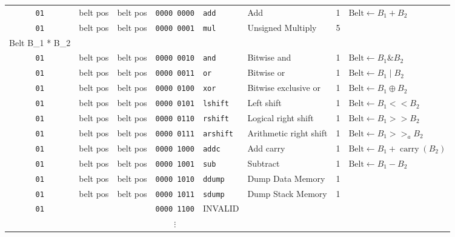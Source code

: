 \documentclass{article}
\begin{document}
\begin{landscape}
\begin{longtable}{c c c c l l c l}
		\texttt{01} & belt pos & belt pos & \texttt{0000 0000} & \texttt{add}     & Add                    & 1 &
			\(\textrm{Belt} \gets B_1 + B_2\) \\
		\texttt{01} & belt pos & belt pos & \texttt{0000 0001} & \texttt{mul}     & Unsigned Multiply      & 5 &
			\(\begin{array}{l}
				\textrm{Belt} \gets \left(B_1 * B_2\right) << 16, \\
				\textrm{Belt} \gets B_1 * B_2
			\end{array}\) \\
		\texttt{01} & belt pos & belt pos & \texttt{0000 0010} & \texttt{and}     & Bitwise and            & 1 &
			\(\textrm{Belt} \gets B_1 \mathop{\&} B_2\) \\
		\texttt{01} & belt pos & belt pos & \texttt{0000 0011} & \texttt{or}      & Bitwise or             & 1 &
			\(\textrm{Belt} \gets B_1 \mathop{|} B_2\) \\
		\texttt{01} & belt pos & belt pos & \texttt{0000 0100} & \texttt{xor}     & Bitwise exclusive or   & 1 &
			\(\textrm{Belt} \gets B_1 \oplus B_2\) \\
		\texttt{01} & belt pos & belt pos & \texttt{0000 0101} & \texttt{lshift}  & Left shift             & 1 &
			\(\textrm{Belt} \gets B_1 << B_2\) \\
		\texttt{01} & belt pos & belt pos & \texttt{0000 0110} & \texttt{rshift}  & Logical right shift    & 1 &
			\(\textrm{Belt} \gets B_1 >> B_2\) \\
		\texttt{01} & belt pos & belt pos & \texttt{0000 0111} & \texttt{arshift} & Arithmetic right shift & 1 &
			\(\textrm{Belt} \gets B_1 >>_a B_2\) \\
		\texttt{01} & belt pos & belt pos & \texttt{0000 1000} & \texttt{addc}    & Add carry              & 1 &
			\(\textrm{Belt} \gets B_1 + \operatorname{carry}\left(B_2\right)\) \\
		\texttt{01} & belt pos & belt pos & \texttt{0000 1001} & \texttt{sub}     & Subtract               & 1 &
			\(\textrm{Belt} \gets B_1 - B_2\) \\
		\texttt{01} & belt pos & belt pos & \texttt{0000 1010} & \texttt{ddump}   & Dump Data Memory       & 1 &
			 \\
		\texttt{01} & belt pos & belt pos & \texttt{0000 1011} & \texttt{sdump}   & Dump Stack Memory       & 1 &
			 \\
		\texttt{01} & & & \texttt{0000 1100} & INVALID & & \\
								& & & \(\vdots\)         &         & & \\

\end{longtable}
\end{landscape}
\end{document}
